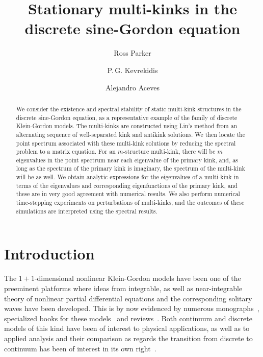 \documentclass[12pt,reqno]{amsart}
\begin{document}
\title{Stationary multi-kinks in the discrete sine-Gordon equation}

\author{Ross Parker}
\address{Department of Mathematics, Southern Methodist University, 
Dallas, TX 75275, USA}

\author{P.\,G. Kevrekidis} 
\address{Department of Mathematics and Statistics, University of Massachusetts, Amherst MA 01003, USA}

\author{Alejandro Aceves}
\address{Department of Mathematics, Southern Methodist University, 
Dallas, TX 75275, USA}

\begin{abstract}
	We consider the existence and spectral stability of static multi-kink structures in the discrete sine-Gordon equation, as
	a representative example of the family of discrete Klein-Gordon
	models. The multi-kinks are constructed using Lin's method from an alternating sequence of well-separated kink and antikink solutions. We then locate the point spectrum associated with these multi-kink solutions by reducing the spectral problem to a matrix equation. For an $m$-structure multi-kink, there will be $m$ eigenvalues in the point spectrum near each eigenvalue of the primary kink, and, as long as the spectrum of the primary kink is imaginary, the spectrum of the multi-kink will be as well. We obtain analytic expressions for the eigenvalues of a multi-kink in terms of the eigenvalues and corresponding eigenfunctions of the primary kink, and these are in very good agreement with numerical results. We also perform numerical time-stepping experiments on perturbations of multi-kinks, and the outcomes of these simulations are interpreted using the spectral results.
\end{abstract}

\maketitle

\section{Introduction}

The $1+1$-dimensional nonlinear Klein-Gordon
models have been one of the preeminent platforms 
where ideas from integrable, as well as near-integrable 
theory of nonlinear
partial differential equations and the corresponding 
solitary waves have been developed. This
is by now evidenced by numerous monographs~\cites{eilbeck,dauxois},
specialized books for these models~\cites{braun2004,SGbook,p4book} 
and reviews~\cites{kivsharmalomed,braun1998}.
Both continuum and discrete models of this kind
have been of interest to physical applications, as well
as to applied analysis and their comparison as regards
the transition from discrete to continuum has been
of interest in its own right~\cite{SGchapter}.
\end{document}

